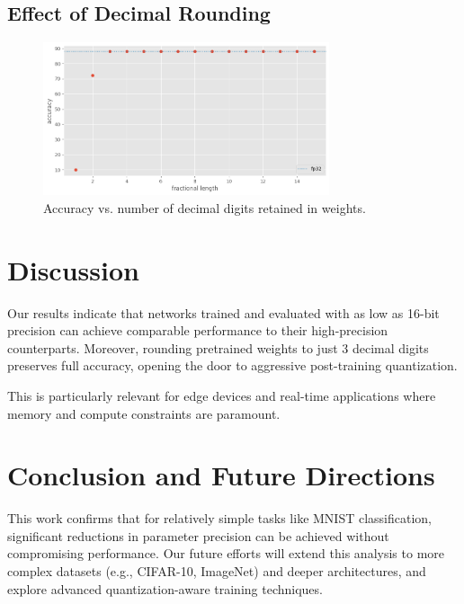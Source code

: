 \documentclass[11pt]{article}
\begin{document}
	\subsection*{Effect of Decimal Rounding}

	\begin{figure}[H]
    	\centering
    	\includegraphics[width=0.75\textwidth]{figures/118_accuracy.png}
    	\caption{Accuracy vs. number of decimal digits retained in weights.}
	\end{figure}

	\section{Discussion}

	Our results indicate that networks trained and evaluated with as low as 16-bit precision can achieve comparable performance to their high-precision counterparts. Moreover, rounding pretrained weights to just 3 decimal digits preserves full accuracy, opening the door to aggressive post-training quantization.

	This is particularly relevant for edge devices and real-time applications where memory and compute constraints are paramount.

	\section{Conclusion and Future Directions}

	This work confirms that for relatively simple tasks like MNIST classification, significant reductions in parameter precision can be achieved without compromising performance. Our future efforts will extend this analysis to more complex datasets (e.g., CIFAR-10, ImageNet) and deeper architectures, and explore advanced quantization-aware training techniques.


	

	\newpage
	\printbibliography
\end{document}
